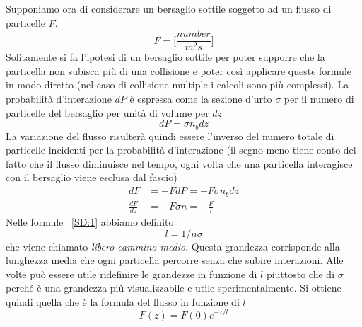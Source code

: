 Supponiamo ora di considerare un bersaglio sottile soggetto ad un flusso di particelle $F$.
\begin{equation}
F=\biggl[\frac{number}{m^2 s}\biggl]
\end{equation}
Solitamente si fa l'ipotesi di un bersaglio sottile per poter supporre che la particella non subisca più di una collisione e poter così applicare queste formule in modo diretto (nel caso di collisione multiple i calcoli sono più complessi).
La probabilità d'interazione $dP$ è espressa come la sezione d'urto $\sigma$ per il numero di particelle del bersaglio per unità di volume per $dz$
\begin{equation}
dP=\sigma n_b dz
\end{equation}
La variazione del flusso risulterà quindi essere l'inverso del numero totale di particelle incidenti per la probabilità d'interazione (il segno meno tiene conto del fatto che il flusso diminuisce nel tempo, ogni volta che una particella interagisce con il bersaglio viene esclusa dal fascio)
\begin{equation}
\begin{split}
dF&=-FdP=-F\sigma n_b dz\\
\frac{dF}{dz}&=-F\sigma n=-\frac{F}{l}
\end{split}
\label{SD:1}
\end{equation}
Nelle formule ~\eqref{SD:1} abbiamo definito
\begin{equation}
l=1/n\sigma
\end{equation} 
che viene chiamato \emph{libero cammino medio}.
Questa grandezza corrisponde alla lunghezza media che ogni particella percorre senza che subire interazioni.
Alle volte può essere utile ridefinire le grandezze in funzione di $l$ piuttosto che di $\sigma$ perché è una grandezza più visualizzabile e utile sperimentalmente.
Si ottiene quindi quella che è la formula del flusso in funzione di $l$
\begin{equation}
F(z)=F(0)e^{-z/l}
\end{equation}


